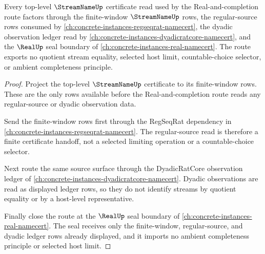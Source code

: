 \begin{theorem}
\label{thm:streamname-top-level-real-completion-dependency}
Every top-level $\StreamNameUp$ certificate read used by the Real-and-completion route factors through the finite-window $\StreamNameUp$ rows, the regular-source rows consumed by \autoref{ch:concrete-instances-regseqrat-namecert}, the dyadic observation ledger read by \autoref{ch:concrete-instances-dyadicratcore-namecert}, and the $\RealUp$ seal boundary of \autoref{ch:concrete-instances-real-namecert}. The route exports no quotient stream equality, selected host limit, countable-choice selector, or ambient completeness principle.
\end{theorem}
\begin{proof}
Project the top-level $\StreamNameUp$ certificate to its finite-window rows. These are the only rows available before the Real-and-completion route reads any regular-source or dyadic observation data.

Send the finite-window rows first through the RegSeqRat dependency in \autoref{ch:concrete-instances-regseqrat-namecert}. The regular-source read is therefore a finite certificate handoff, not a selected limiting operation or a countable-choice selector.

Next route the same source surface through the DyadicRatCore observation ledger of \autoref{ch:concrete-instances-dyadicratcore-namecert}. Dyadic observations are read as displayed ledger rows, so they do not identify streams by quotient equality or by a host-level representative.

Finally close the route at the $\RealUp$ seal boundary of \autoref{ch:concrete-instances-real-namecert}. The seal receives only the finite-window, regular-source, and dyadic ledger rows already displayed, and it imports no ambient completeness principle or selected host limit.
\end{proof}

